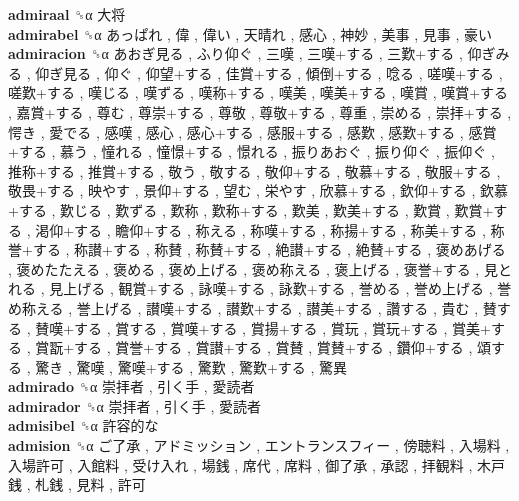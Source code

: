 \textbf{admiraal} ␝α   大将   \\
\textbf{admirabel} ␝α   あっぱれ ,  偉 ,  偉い ,  天晴れ ,  感心 ,  神妙 ,  美事 ,  見事 ,  豪い   \\
\textbf{admiracion} ␝α   あおぎ見る ,  ふり仰ぐ ,  三嘆 ,  三嘆+する ,  三歎+する ,  仰ぎみる ,  仰ぎ見る ,  仰ぐ ,  仰望+する ,  佳賞+する ,  傾倒+する ,  唸る ,  嗟嘆+する ,  嗟歎+する ,  嘆じる ,  嘆ずる ,  嘆称+する ,  嘆美 ,  嘆美+する ,  嘆賞 ,  嘆賞+する ,  嘉賞+する ,  尊む ,  尊崇+する ,  尊敬 ,  尊敬+する ,  尊重 ,  崇める ,  崇拝+する ,  愕き ,  愛でる ,  感嘆 ,  感心 ,  感心+する ,  感服+する ,  感歎 ,  感歎+する ,  感賞+する ,  慕う ,  憧れる ,  憧憬+する ,  憬れる ,  振りあおぐ ,  振り仰ぐ ,  振仰ぐ ,  推称+する ,  推賞+する ,  敬う ,  敬する ,  敬仰+する ,  敬慕+する ,  敬服+する ,  敬畏+する ,  映やす ,  景仰+する ,  望む ,  栄やす ,  欣慕+する ,  欽仰+する ,  欽慕+する ,  歎じる ,  歎ずる ,  歎称 ,  歎称+する ,  歎美 ,  歎美+する ,  歎賞 ,  歎賞+する ,  渇仰+する ,  瞻仰+する ,  称える ,  称嘆+する ,  称揚+する ,  称美+する ,  称誉+する ,  称讃+する ,  称賛 ,  称賛+する ,  絶讃+する ,  絶賛+する ,  褒めあげる ,  褒めたたえる ,  褒める ,  褒め上げる ,  褒め称える ,  褒上げる ,  褒誉+する ,  見とれる ,  見上げる ,  観賞+する ,  詠嘆+する ,  詠歎+する ,  誉める ,  誉め上げる ,  誉め称える ,  誉上げる ,  讃嘆+する ,  讃歎+する ,  讃美+する ,  讚する ,  貴む ,  賛する ,  賛嘆+する ,  賞する ,  賞嘆+する ,  賞揚+する ,  賞玩 ,  賞玩+する ,  賞美+する ,  賞翫+する ,  賞誉+する ,  賞讃+する ,  賞賛 ,  賞賛+する ,  鑽仰+する ,  頌する ,  驚き ,  驚嘆 ,  驚嘆+する ,  驚歎 ,  驚歎+する ,  驚異   \\
\textbf{admirado} ␝α   崇拝者 ,  引く手 ,  愛読者   \\
\textbf{admirador} ␝α   崇拝者 ,  引く手 ,  愛読者   \\
\textbf{admisibel} ␝α   許容的な   \\
\textbf{admision} ␝α   ご了承 ,  アドミッション ,  エントランスフィー ,  傍聴料 ,  入場料 ,  入場許可 ,  入館料 ,  受け入れ ,  場銭 ,  席代 ,  席料 ,  御了承 ,  承認 ,  拝観料 ,  木戸銭 ,  札銭 ,  見料 ,  許可   \\
